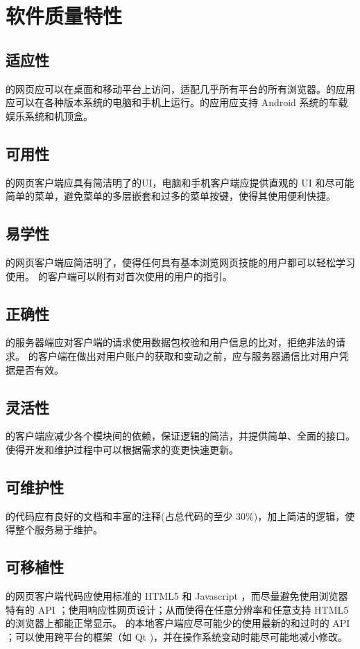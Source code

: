 \chapter{软件质量特性}

\section {适应性}
\proname 的网页应可以在桌面和移动平台上访问，适配几乎所有平台的所有浏览器。\proname 的应用应可以在各种版本系统的电脑和手机上运行。\proname 的应用应支持 Android 系统的车载娱乐系统和机顶盒。

\section {可用性}
\proname 的网页客户端应具有简洁明了的UI，电脑和手机客户端应提供直观的 UI 和尽可能简单的菜单，避免菜单的多层嵌套和过多的菜单按键，使得其使用便利快捷。

\section {易学性}
\proname 的网页客户端应简洁明了，使得任何具有基本浏览网页技能的用户都可以轻松学习使用。 \proname 的客户端可以附有对首次使用的用户的指引。

\section {正确性}
\proname 的服务器端应对客户端的请求使用数据包校验和用户信息的比对，拒绝非法的请求。
\proname 的客户端在做出对用户账户的获取和变动之前，应与服务器通信比对用户凭据是否有效。

\section {灵活性}
\proname 的客户端应减少各个模块间的依赖，保证逻辑的简洁，并提供简单、全面的接口。使得开发和维护过程中可以根据需求的变更快速更新。

\section {可维护性}
\proname 的代码应有良好的文档和丰富的注释(占总代码的至少 30\%)，加上简洁的逻辑，使得整个服务易于维护。

\section {可移植性}
\proname 的网页客户端代码应使用标准的 HTML5 和 Javascript ，而尽量避免使用浏览器特有的 API ；使用响应性网页设计；从而使得在任意分辨率和任意支持 HTML5 的浏览器上都能正常显示。 \proname 的本地客户端应尽可能少的使用最新的和过时的 API ；可以使用跨平台的框架（如 Qt )，并在操作系统变动时能尽可能地减小修改。

